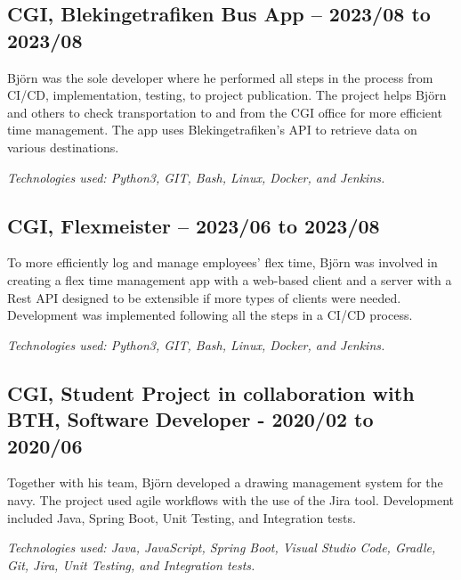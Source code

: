 \begin{minipage}[t]{0.7\textwidth}
\subsection*{\textcolor{colorTitelErfarenhet}{CGI, Blekingetrafiken Bus App – 2023/08 to 2023/08}}
Björn was the sole developer where he performed all steps in the process from CI/CD, implementation, testing, to project publication. The project helps Björn and others to check transportation to and from the CGI office for more efficient time management. The app uses Blekingetrafiken's API to retrieve data on various destinations.

\vspace{5pt}\textit{Technologies used: Python3, GIT, Bash, Linux, Docker, and Jenkins.}

\vspace{15pt} %

\subsection*{\textcolor{colorTitelErfarenhet}{CGI, Flexmeister – 2023/06 to 2023/08}}
To more efficiently log and manage employees' flex time, Björn was involved in creating a flex time management app with a web-based client and a server with a Rest API designed to be extensible if more types of clients were needed. Development was implemented following all the steps in a CI/CD process.

\vspace{5pt}\textit{Technologies used: Python3, GIT, Bash, Linux, Docker, and Jenkins.}

\vspace{15pt} %
\subsection*{\textcolor{colorTitelErfarenhet}{CGI, Student Project in collaboration with BTH, Software Developer - 2020/02 to 2020/06}}
Together with his team, Björn developed a drawing management system for the navy. The project used agile workflows with the use of the Jira tool. Development included Java, Spring Boot, Unit Testing, and Integration tests.

\vspace{5pt}\textit{Technologies used: Java, JavaScript, Spring Boot, Visual Studio Code, Gradle, Git, Jira, Unit Testing, and Integration tests.} 


\end{minipage}
